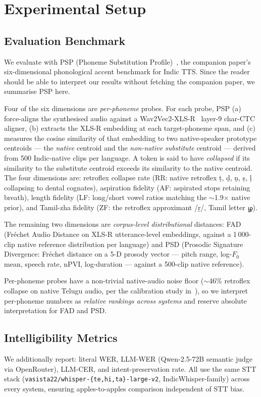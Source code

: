 \documentclass[conference,a4paper]{IEEEtran}
\newcommand{\textta}[1]{{\tamilfont #1}}
\newcommand{\psp}{\textsc{PSP}}
\begin{document}
\section{Experimental Setup}
\label{sec:setup}

\subsection{Evaluation Benchmark}
\label{sec:psp_summary}
We evaluate with \psp{} (Phoneme Substitution Profile)~\cite{psp2026}, the companion paper's six-dimensional phonological accent benchmark for Indic TTS. Since the reader should be able to interpret our results without fetching the companion paper, we summarise \psp{} here.

Four of the six dimensions are \emph{per-phoneme} probes. For each probe, \psp{} (a) force-aligns the synthesised audio against a Wav2Vec2-XLS-R~\cite{babu2021xlsr} layer-9 char-CTC aligner, (b) extracts the XLS-R embedding at each target-phoneme span, and (c) measures the cosine similarity of that embedding to two native-speaker prototype centroids --- the \emph{native} centroid and the \emph{non-native substitute} centroid --- derived from 500 Indic-native clips per language. A token is said to have \emph{collapsed} if its similarity to the substitute centroid exceeds its similarity to the native centroid. The four dimensions are: retroflex collapse rate (RR: native retroflex \d{t}, \d{d}, \d{n}, \d{s}, \d{l} collapsing to dental cognates), aspiration fidelity (AF: aspirated stops retaining breath), length fidelity (LF: long/short vowel ratios matching the $\sim$1.9$\times$ native prior), and Tamil-zha fidelity (ZF: the retroflex approximant /\b{r}/, Tamil letter \textta{ழ}).

The remaining two dimensions are \emph{corpus-level distributional} distances: FAD (Fr\'echet Audio Distance on XLS-R utterance-level embeddings, against a 1\,000-clip native reference distribution per language) and PSD (Prosodic Signature Divergence: Fr\'echet distance on a 5-D prosody vector --- pitch range, log-$F_0$ mean, speech rate, nPVI, log-duration --- against a 500-clip native reference).

Per-phoneme probes have a non-trivial native-audio noise floor ($\sim$46\% retroflex collapse on native Telugu audio, per the calibration study in~\cite{psp2026}), so we interpret per-phoneme numbers as \emph{relative rankings across systems} and reserve absolute interpretation for FAD and PSD.

\subsection{Intelligibility Metrics}
We additionally report: literal WER, LLM-WER (Qwen-2.5-72B semantic judge via OpenRouter), LLM-CER, and intent-preservation rate. All use the same STT stack (\texttt{vasista22/whisper-\{te,hi,ta\}-large-v2}, IndicWhisper-family) across every system, ensuring apples-to-apples comparison independent of STT bias.
\end{document}
